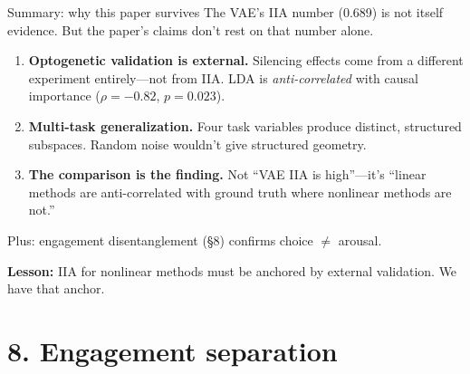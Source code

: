 \documentclass[aspectratio=169,11pt]{beamer}
\begin{document}
\begin{frame}{Summary: why this paper survives}
\vspace{-0.3em}
The VAE's IIA number (0.689) is not itself evidence. But the paper's claims don't rest on that number alone.
\vspace{0.3em}
\begin{enumerate}
  \item \textbf{Optogenetic validation is external.} Silencing effects come from a different experiment entirely---not from IIA. LDA is \emph{anti-correlated} with causal importance ($\rho = -0.82$, $p = 0.023$).
  \item \textbf{Multi-task generalization.} Four task variables produce distinct, structured subspaces. Random noise wouldn't give structured geometry.
  \item \textbf{The comparison is the finding.} Not ``VAE IIA is high''---it's ``linear methods are anti-correlated with ground truth where nonlinear methods are not.''
\end{enumerate}
\vspace{0.3em}
{\small Plus: engagement disentanglement (\S8) confirms choice $\neq$ arousal.}

\vspace{0.3em}
\textbf{Lesson:} IIA for nonlinear methods must be anchored by external validation. We have that anchor.
\end{frame}

\section{8. Engagement separation}
\end{document}
